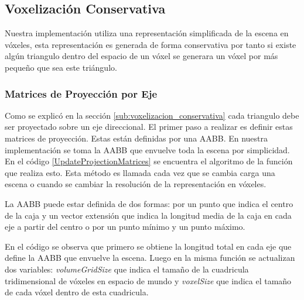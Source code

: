 \subsection{Voxelización Conservativa} %
\label{sub:voxelization_impl}
Nuestra implementación utiliza una representación simplificada de la escena en vóxeles, esta representación es generada de forma conservativa por tanto si existe algún triangulo dentro del espacio de un vóxel se generara un vóxel por más pequeño que sea este triángulo.
 
\subsubsection{Matrices de Proyección por Eje}

Como se explicó en la sección \ref{sub:voxelizacion_conservativa} cada triangulo debe ser proyectado sobre un eje direccional. El primer paso a realizar es definir estas matrices de proyección. Estas están definidas por una \ac{AABB}. En nuestra implementación se toma la \ac{AABB} que envuelve toda la escena por simplicidad. En el código \ref{UpdateProjectionMatrices} se encuentra el algoritmo de la función que realiza esto. Esta método es llamada cada vez que se cambia carga una escena o cuando se cambiar la resolución de la representación en vóxeles.

La \ac{AABB} puede estar definida de dos formas: por un punto que indica el centro de la caja y un vector extensión que indica la longitud media de la caja en cada eje a partir del centro o por un punto mínimo y un punto máximo. 

En el código se observa que primero se obtiene la longitud total en cada eje que define la \ac{AABB} que envuelve la escena. Luego en la misma función se actualizan dos variables: \emph{volumeGridSize} que indica el tamaño de la cuadricula tridimensional de vóxeles en espacio de mundo y \emph{voxelSize} que indica el tamaño de cada vóxel dentro de esta cuadricula. 

